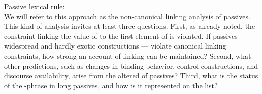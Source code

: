 \documentclass[output=paper,biblatex,babelshorthands,newtxmath,draftmode,colorlinks, citecolor=brown]{langscibook}
\begin{document}
\ea
\label{pass-lr}
Passive lexical rule:\\
\z
We will refer to this approach as the non-canonical linking analysis of passives. This kind of analysis invites at least three questions.
First, as already noted, the constraint linking the value of  to the first element of \argst is violated.
If passives --- widespread and hardly exotic constructions --- violate canonical linking constraints, how strong an account of linking can be maintained?
Second, what other predictions, such as changes in binding behavior, control constructions, and discourse availability, arise from the altered \argst of passives?
Third, what is the status of the -phrase in long passives, and how is it represented on the \argst list?
\end{document}
